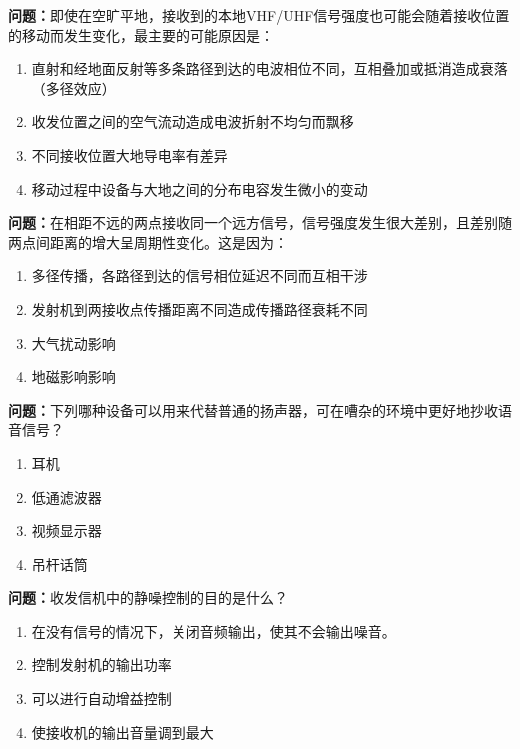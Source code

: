 \bigskip


\noindent\textbf{问题：}即使在空旷平地，接收到的本地VHF/UHF信号强度也可能会随着接收位置的移动而发生变化，最主要的可能原因是：
\begin{enumerate}[label=\Alph*), leftmargin=3em]
\item 直射和经地面反射等多条路径到达的电波相位不同，互相叠加或抵消造成衰落（多径效应）
\item 收发位置之间的空气流动造成电波折射不均匀而飘移
\item 不同接收位置大地导电率有差异
\item 移动过程中设备与大地之间的分布电容发生微小的变动
\end{enumerate}

\bigskip


\noindent\textbf{问题：}在相距不远的两点接收同一个远方信号，信号强度发生很大差别，且差别随两点间距离的增大呈周期性变化。这是因为：
\begin{enumerate}[label=\Alph*), leftmargin=3em]
\item 多径传播，各路径到达的信号相位延迟不同而互相干涉
\item 发射机到两接收点传播距离不同造成传播路径衰耗不同
\item 大气扰动影响
\item 地磁影响影响
\end{enumerate}

\bigskip


\noindent\textbf{问题：}下列哪种设备可以用来代替普通的扬声器，可在嘈杂的环境中更好地抄收语音信号？
\begin{enumerate}[label=\Alph*), leftmargin=3em]
\item 耳机
\item 低通滤波器
\item 视频显示器
\item 吊杆话筒
\end{enumerate}

\bigskip


\noindent\textbf{问题：}收发信机中的静噪控制的目的是什么？
\begin{enumerate}[label=\Alph*), leftmargin=3em]
\item 在没有信号的情况下，关闭音频输出，使其不会输出噪音。
\item 控制发射机的输出功率
\item 可以进行自动增益控制
\item 使接收机的输出音量调到最大
\end{enumerate}

\bigskip


